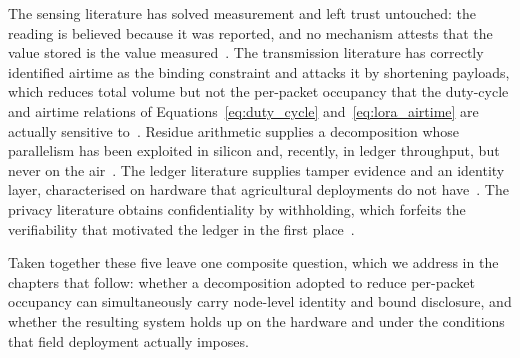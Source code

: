 The sensing literature has solved measurement and left trust untouched: the
reading is believed because it was reported, and no mechanism attests that the
value stored is the value measured~\cite{soussi2024smartsensors, aydin2021comprehensive}. The transmission literature has correctly identified
airtime as the binding constraint and attacks it by shortening payloads, which
reduces total volume but not the per-packet occupancy that
the duty-cycle and airtime relations of Equations~\ref{eq:duty_cycle}
and~\ref{eq:lora_airtime} are actually sensitive to~\cite{marcelloni2009energy, chen2025compression}. Residue arithmetic
supplies a decomposition whose parallelism has been exploited in silicon and,
recently, in ledger throughput, but never on the
air~\cite{parhami2010computer, luo2023researchapplication, maiwada2025blockchainscalability}. The ledger literature supplies tamper
evidence and an identity layer, characterised on hardware that agricultural
deployments do not have~\cite{tar2023fabric, zulkarnain2025performancebenchmarking}. The privacy literature obtains
confidentiality by withholding, which forfeits the verifiability that motivated
the ledger in the first place~\cite{kormiltsyn2023privacyconflict, yousif2026enablingprivacy}.

Taken together these five leave one composite question, which we address in
the chapters that follow: whether a decomposition adopted to reduce per-packet
occupancy can simultaneously carry node-level identity and bound disclosure,
and whether the resulting system holds up on the hardware and under the
conditions that field deployment actually imposes.
